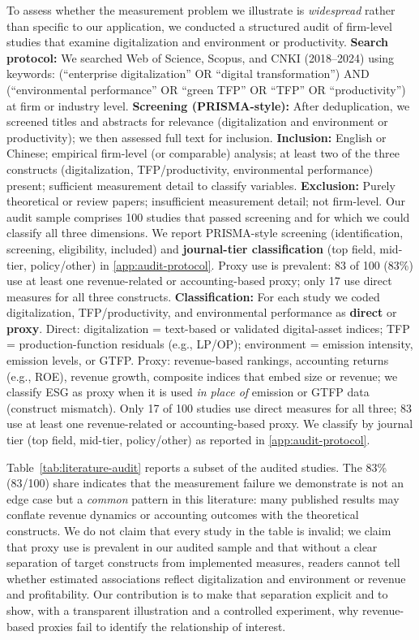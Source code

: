 To assess whether the measurement problem we illustrate is \emph{widespread} rather than specific to our application, we conducted a structured audit of firm-level studies that examine digitalization and environment or productivity. \textbf{Search protocol:} We searched Web of Science, Scopus, and CNKI (2018--2024) using keywords: (``enterprise digitalization'' OR ``digital transformation'') AND (``environmental performance'' OR ``green TFP'' OR ``TFP'' OR ``productivity'') at firm or industry level. \textbf{Screening (PRISMA-style):} After deduplication, we screened titles and abstracts for relevance (digitalization and environment or productivity); we then assessed full text for inclusion. \textbf{Inclusion:} English or Chinese; empirical firm-level (or comparable) analysis; at least two of the three constructs (digitalization, TFP/productivity, environmental performance) present; sufficient measurement detail to classify variables. \textbf{Exclusion:} Purely theoretical or review papers; insufficient measurement detail; not firm-level. Our audit sample comprises 100 studies that passed screening and for which we could classify all three dimensions. We report PRISMA-style screening (identification, screening, eligibility, included) and \textbf{journal-tier classification} (top field, mid-tier, policy/other) in \ref{app:audit-protocol}. Proxy use is prevalent: 83 of 100 (83\%) use at least one revenue-related or accounting-based proxy; only 17 use direct measures for all three constructs. \textbf{Classification:} For each study we coded digitalization, TFP/productivity, and environmental performance as \textbf{direct} or \textbf{proxy}. Direct: digitalization = text-based or validated digital-asset indices; TFP = production-function residuals (e.g., LP/OP); environment = emission intensity, emission levels, or GTFP. Proxy: revenue-based rankings, accounting returns (e.g., ROE), revenue growth, composite indices that embed size or revenue; we classify ESG as proxy when it is used \emph{in place of} emission or GTFP data (construct mismatch). Only 17 of 100 studies use direct measures for all three; 83 use at least one revenue-related or accounting-based proxy. We classify by journal tier (top field, mid-tier, policy/other) as reported in \ref{app:audit-protocol}.

Table~\ref{tab:literature-audit} reports a subset of the audited studies. The 83\% (83/100) share indicates that the measurement failure we demonstrate is not an edge case but a \emph{common} pattern in this literature: many published results may conflate revenue dynamics or accounting outcomes with the theoretical constructs. We do not claim that every study in the table is invalid; we claim that proxy use is prevalent in our audited sample and that without a clear separation of target constructs from implemented measures, readers cannot tell whether estimated associations reflect digitalization and environment or revenue and profitability. Our contribution is to make that separation explicit and to show, with a transparent illustration and a controlled experiment, why revenue-based proxies fail to identify the relationship of interest.

